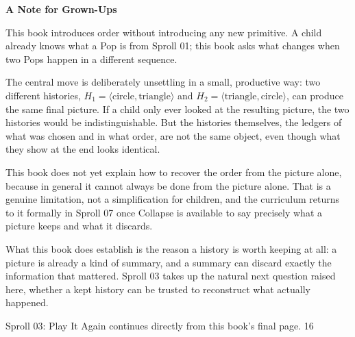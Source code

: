 \documentclass[12pt]{book}
\newcommand{\pagenum}[1]{\vfill{\color{gray!50}\footnotesize #1}}
\newcommand{\sprollpage}{\newpage\vspace*{0.4in}}
\begin{document}
\sprollpage
\vspace*{0.3in}
{\large \textbf{A Note for Grown-Ups}}
\vspace{0.2in}

\normalsize
This book introduces order without introducing any new primitive. A child already knows what a Pop is from Sproll 01; this book asks what changes when two Pops happen in a different sequence.

\vspace{0.15in}
The central move is deliberately unsettling in a small, productive way: two different histories, $H_1 = \langle \text{circle}, \text{triangle} \rangle$ and $H_2 = \langle \text{triangle}, \text{circle} \rangle$, can produce the same final picture. If a child only ever looked at the resulting picture, the two histories would be indistinguishable. But the histories themselves, the ledgers of what was chosen and in what order, are not the same object, even though what they show at the end looks identical.

\vspace{0.15in}
This book does not yet explain how to recover the order from the picture alone, because in general it cannot always be done from the picture alone. That is a genuine limitation, not a simplification for children, and the curriculum returns to it formally in Sproll 07 once Collapse is available to say precisely what a picture keeps and what it discards.

\vspace{0.15in}
What this book does establish is the reason a history is worth keeping at all: a picture is already a kind of summary, and a summary can discard exactly the information that mattered. Sproll 03 takes up the natural next question raised here, whether a kept history can be trusted to reconstruct what actually happened.

\vspace{0.3in}
{\small Sproll 03: Play It Again continues directly from this book's final page.}
\pagenum{16}
\end{document}

